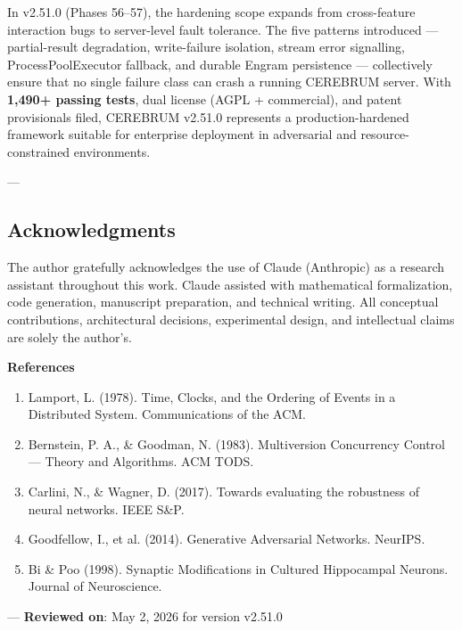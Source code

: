 In v2.51.0 (Phases 56–57), the hardening scope expands from cross-feature interaction bugs to server-level fault tolerance. The five patterns introduced — partial-result degradation, write-failure isolation, stream error signalling, ProcessPoolExecutor fallback, and durable Engram persistence — colle\-ctively ensure that no single failure class can crash a running CEREBRUM server. With \textbf{1,490+ passing tests}, dual license (AGPL + commercial), and patent provi\-sionals filed, CEREBRUM v2.51.0 represents a production-hardened framework suitable for enterprise deployment in adversarial and resource-constrained envir\-onments.

---
\subsection{Acknow\-ledgments}

The author gratefully ackno\-wledges the use of Claude (Anthropic) as a research assistant throughout this work. Claude assisted with mathe\-matical forma\-lization, code generation, manuscript preparation, and technical writing. All conceptual contr\-ibutions, archi\-tectural decisions, exper\-imental design, and intel\-lectual claims are solely the author's.

\textbf{References}
\begin{enumerate}
\item Lamport, L. (1978). Time, Clocks, and the Ordering of Events in a Distributed System. Commun\-ications of the ACM.
\item Bernstein, P. A., \& Goodman, N. (1983). Multiv\-ersion Concurrency Control — Theory and Algorithms. ACM TODS.
\item Carlini, N., \& Wagner, D. (2017). Towards evaluating the robustness of neural networks. IEEE S\&P.
\item Goodfellow, I., et al. (2014). Generative Adversarial Networks. NeurIPS.
\item Bi \& Poo (1998). Synaptic Modifi\-cations in Cultured Hippocampal Neurons. Journal of Neuros\-cience.

\end{enumerate}
---
\textbf{Reviewed on}: May 2, 2026 for version v2.51.0
